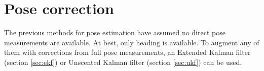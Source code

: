 \section{Pose correction}

The previous methods for pose estimation have assumed no direct pose
measurements are available. At best, only heading is available. To augment any
of them with corrections from full pose measurements, an Extended Kalman filter
(section \ref{sec:ekf}) or Unscented Kalman filter (section \ref{sec:ukf}) can
be used.
